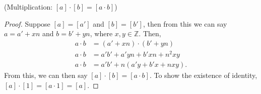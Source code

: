 \documentclass[11pt]{article}
\renewcommand\part[1]{\vspace{.10in}(#1)\par}
\newcommand{\Z}{\mathbb{Z}}
\begin{document}
\pagebreak

\part{Multiplication: $[a]\cdot[b] = [a\cdot b]$}
\begin{proof}
	Suppose $[a]=[a']$ and $[b]=[b']$, then from this we can say $a=a'+xn$ and $b=b'+yn$, where $x,y \in \Z$. Then,
	\begin{align*}
	 	a \cdot b &= (a'+xn) \cdot (b'+yn)\\
	 	a \cdot b &= a'b' + a'yn + b'xn + n^2xy\\
	 	a \cdot b &= a'b' + n(a'y + b'x + nxy).
	 \end{align*}
	 From this, we can then say $[a] \cdot [b] = [a \cdot b]$. To show the existence of identity, $[a]\cdot[1] = [a \cdot 1] = [a]$.
\end{proof}


	
\end{document}
